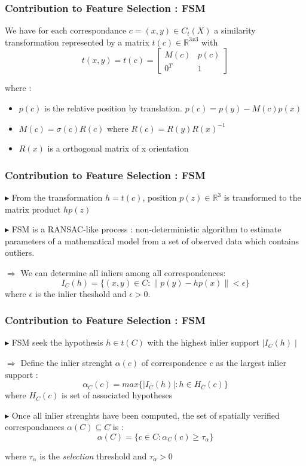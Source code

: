 \documentclass[11pt]{beamer}
\begin{document}
\begin{frame}
\frametitle{Contribution to Feature Selection : FSM}

We have for each correspondance $c = (x,y) \in C_t(X)$ a similarity transformation represented by a matrix $t(c) \in \mathbb{R}^{3x3}$ with
\[
t(x,y) = t(c) = 
\begin{bmatrix}
M(c) & p(c) \\
0^T & 1
\end{bmatrix}
\]

where :
\begin{itemize}
\item $p(c)$ is the relative position by translation. $p(c) = p(y) - M(c)p(x)$
\item $M(c) = \sigma(c)R(c)$ where $R(c) = R(y)R(x)^{-1}$
\item $R(x)$ is a orthogonal matrix of x orientation 
\end{itemize}
\end{frame}

\begin{frame}
\frametitle{Contribution to Feature Selection : FSM}
$\blacktriangleright$ From the transformation $h = t(c)$, position $p(z) \in \mathbb{R}^3$ is transformed to the matrix product $hp(z)$

\vspace{0.2cm}
$\blacktriangleright$ FSM is a RANSAC-like process : non-deterministic algorithm to estimate parameters of a mathematical model from a set of observed data which contains outliers.

\vspace{0.2cm}
$\Rightarrow$ We can determine all inliers among all correspondences:
\[ I_C(h) = \{(x,y) \in C :  \| p(y) - hp(x) \| < \epsilon \}  \]
where $\epsilon$ is the inlier theshold and $\epsilon > 0$.

\end{frame}

\begin{frame}
\frametitle{Contribution to Feature Selection : FSM}
$\blacktriangleright$ FSM seek the hypothesis $h \in t(C)$ with the highest inlier support $\mid I_C(h) \mid$

\vspace{0.2cm}
$\Rightarrow$ Define the inlier strenght $\alpha(c)$ of correspondence $c$ as the largest inlier support :
\[ \alpha_C(c) = max\{\mid I_C(h) \mid : h \in H_C(c)\} \]
where $H_C(c)$ is set of associated hypotheses

\vspace{0.3cm}
$\blacktriangleright$ Once all inlier strenghts have been computed, the set of spatially verified correspondances $\alpha(C) \subseteq C$ is :
\[\alpha(C) = \{ c \in C : \alpha_C(c) \geq \tau_\alpha \} \]

where $\tau_\alpha$ is the \textit{selection} threshold and $\tau_\alpha > 0$
\end{frame}
\end{document}
